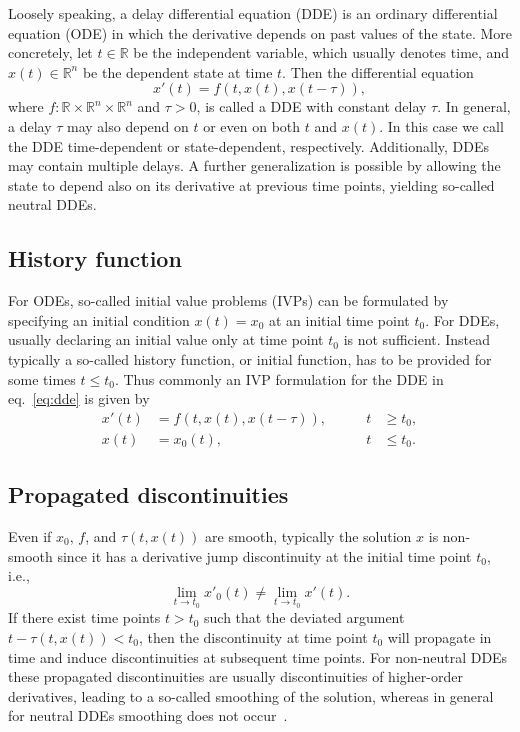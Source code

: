 \documentclass{juliacon}
\begin{document}
Loosely speaking, a delay differential equation (DDE) is an ordinary
differential equation (ODE) in which the derivative depends on past
values of the state. More concretely, let $t \in \mathbb{R}$ be the 
independent variable, which usually denotes
time, and $x(t) \in \mathbb{R}^n$ be the dependent state at time $t$. Then
the differential equation
\begin{equation}\label{eq:dde}
    x'(t) = f(t, x(t), x(t - \tau)),
\end{equation}
where $f \colon \mathbb{R} \times \mathbb{R}^n \times \mathbb{R}^n$ and
$\tau > 0$, is called a DDE with constant delay $\tau$. In general, 
a delay $\tau$ may also depend on $t$ or even on both $t$ and $x(t)$.
In this case we call the DDE time-dependent or state-dependent, respectively.
Additionally, DDEs may contain multiple delays. A further generalization is
possible by allowing the state to depend also on its derivative at previous
time points, yielding so-called neutral DDEs.

\subsection{History function}

For ODEs, so-called initial value problems (IVPs) can be formulated by specifying
an initial condition $x(t) = x_0$ at an initial time point $t_0$. For DDEs, 
usually declaring an initial value only at time point $t_0$ is not sufficient.
Instead typically a so-called history function, or initial function, has to be
provided for some times $t \leq t_0$. Thus commonly an IVP formulation for the DDE
in eq.~\eqref{eq:dde} is given by
\begin{equation}\label{eq:dde_ivp}
    \begin{aligned}
        x'(t) &= f(t, x(t), x(t - \tau)), \qquad & t &\geq t_0, \\
        x(t) &= x_0(t), \qquad &t &\leq t_0.
    \end{aligned}
\end{equation}

\subsection{Propagated discontinuities}\label{sec:disc}

Even if $x_0$, $f$, and $\tau(t, x(t))$ are smooth, typically the solution $x$
is non-smooth since it has a derivative jump discontinuity at the initial time
point $t_0$, i.e.,
\begin{equation*}
    \lim_{t \to t_0} x'_0(t) \neq \lim_{t \to t_0} x'(t).
\end{equation*}
If there exist time points $t > t_0$ such that the deviated
argument $t - \tau(t, x(t)) < t_0$, then the discontinuity at time point $t_0$
will propagate in time and induce discontinuities at subsequent time points.
For non-neutral DDEs these propagated discontinuities are usually discontinuities
of higher-order derivatives, leading to a so-called smoothing of the solution,
whereas in general for neutral DDEs smoothing does not occur~\cite{bellen03_numer_methods_delay_differ_equat,neves76_charact_jump_discont_state_depend}.
\end{document}
